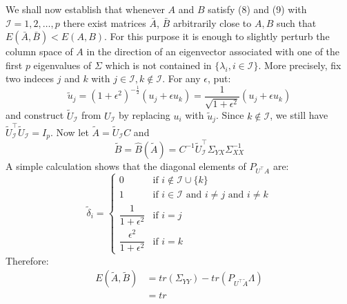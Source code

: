 We shall now establish that whenever $A$ and $B$ satisfy (8) and (9) with $\mathcal{I} = {1,  2, \dots, p}$ there exist matrices $\bar{A}$, $\bar{B}$ arbitrarily close to $A,B$ such that $E(\bar{A},\bar{B}) < E(A,B)$. For this purpose it is enough to slightly perturb the column space of $A$ in the direction of an eigenvector associated with one of the first $p$ eigenvalues of $\Sigma$ which is not contained in $\{\lambda_i, i \in \mathcal{I}\}$. More precisely, fix two indeces $j$ and $k$ with $j \in \mathcal{I}, k \not\in \mathcal{I}$. For any $\epsilon$, put:
\[
    \tilde{u}_j = (1+\epsilon^2)^{-\frac{1}{2}}(u_j + \epsilon u_k) = \dfrac{1}{\sqrt{1+\epsilon^2}}(u_j + \epsilon u_k) 
\]
and construct $\tilde{U}_\mathcal{I}$ from $U_\mathcal{I}$ by replacing $u_i$ with $\tilde{u}_j$. Since $k \not\in \mathcal{I}$, we still have $\tilde{U}^\intercal_\mathcal{I} \tilde{U}_\mathcal{I} = I_p$. Now let $\tilde{A} = \tilde{U}_\mathcal{I} C$ and
\[
    \tilde{B} = \hat{B}(\tilde{A}) = C^{-1}\tilde{U}^\intercal_\mathcal{I} \Sigma_{YX}\Sigma_{XX}^{-1}    
\]
A simple calculation shows that the diagonal elements of $P_{U^\intercal A}$ are:
\[
    \tilde{\delta}_i = 
    \begin{cases}
        0 & \text{if } i \not \in \mathcal{I} \cup \{k\}\\
        1 & \text{if } i \in \mathcal{I} \text{ and } i \neq j \text{ and } i \neq k\\
        \dfrac{1}{1+\epsilon^2} & \text{if } i = j\\
        \dfrac{\epsilon^2}{1 + \epsilon^2} &\text{if } i = k
    \end{cases}    
\]
Therefore:
\[
    \begin{split}
        E(\tilde{A},\tilde{B}) &= tr(\Sigma_{YY}) - tr(P_{U^\intercal \tilde{A}}\Lambda)\\
        &= tr
    \end{split}    
\]